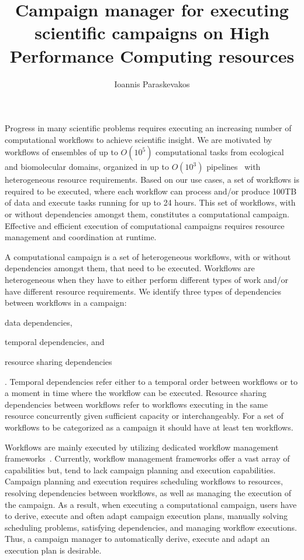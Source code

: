 
\title{Campaign manager for executing scientific campaigns on High Performance Computing resources}\author{Ioannis Paraskevakos}


\maketitle

Progress in many scientific problems requires executing an increasing number of computational workflows to achieve scientific insight. We are motivated by workflows of ensembles of up to $O(10^5)$ computational tasks from ecological and biomolecular domains, organized in up to $O(10^3)$ pipelines~\cite{rietmann2012forward, dakka2018high, paraskevakos2019workflow} with heterogeneous resource requirements. Based on our use cases, a set of workflows is required to be executed, where each workflow can process and/or produce 100TB of data and execute tasks running for up to 24 hours. This set of workflows, with or without dependencies amongst them, constitutes a computational campaign. Effective and efficient execution of computational campaigns requires resource management and coordination at runtime.

A computational campaign is a set of heterogeneous workflows, with or without dependencies amongst them, that need to be executed. Workflows are heterogeneous when they have to either perform different types of work and/or have different resource requirements. We identify three types of dependencies between workflows in a campaign:
\begin{inparaenum}[1)]
\item data dependencies, 
\item temporal dependencies, and 
\item resource sharing dependencies
\end{inparaenum}. 
Temporal dependencies refer either to a temporal order between workflows or to a moment in time where the workflow can be executed. Resource sharing dependencies between workflows refer to workflows executing in the same resource concurrently given sufficient capacity or interchangeably. For a set of workflows to be categorized as a campaign it should have at least ten workflows.

Workflows are mainly executed by utilizing dedicated workflow management frameworks~\cite{balasubramanian2018harnessing,deelman2015pegasus,ludascher2006scientific,rocklin2015dask,airflow}. Currently, workflow management frameworks offer a vast array of capabilities but, tend to lack campaign planning and execution capabilities. Campaign planning and execution requires scheduling workflows to resources, resolving dependencies between workflows, as well as managing the execution of the campaign. As a result, when executing a computational campaign, users have to derive, execute and often adapt campaign execution plans, manually solving scheduling problems, satisfying dependencies, and managing workflow executions. Thus, a campaign manager to automatically derive, execute and adapt an execution plan is desirable.

